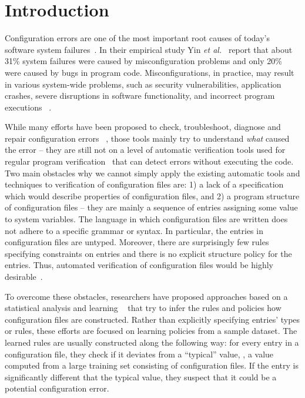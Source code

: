 \section{Introduction}
\label{sec-intro}

Configuration errors are one of the most important root causes of
today's software system failures~\cite{xu15systems, yin11anempirical}.
In their empirical study Yin {\em et al.}~\cite{yin11anempirical} report
that about 31\% system failures were caused by misconfiguration problems and only 20\% were caused by bugs in program code. 
Misconfigurations, in practice, may result in various
system-wide problems, such as security vulnerabilities, 
application crashes, severe disruptions in software
functionality, and incorrect program executions%
~\cite{zhang14encore, yuan11context, xu13do, xu15hey}.  

While many efforts have been proposed 
to check, troubleshoot, diagnose and repair configuration errors%
~\cite{attariyan10automating,
su07autobash, whitaker04configuration},
those tools mainly try to understand {\emph{what}} caused the 
error -- they are still not on a level of
automatic verification tools used for regular program 
verification~\cite{Leino10Dafny, PiskacWZ14, BobotFMP15} that can
detect errors without executing the code.
Two main obstacles why we cannot simply apply the existing automatic 
tools and techniques to verification of configuration files are: 1) a lack
of a specification which would describe properties of configuration files, and 2) a program structure of configuration files -- they
are mainly a sequence of entries assigning some value to system variables. The language in which configuration files are written does 
not adhere to a specific grammar or syntax. In particular, the
entries in configuration files are untyped. Moreover, there are surprisingly few rules specifying constraints on entries and there
is no explicit structure policy for the entries.
Thus, automated verification of configuration 
files would be highly
desirable~\cite{wang04automatic, zhang14encore, xu15systems}.

To overcome these obstacles, researchers have proposed approaches based on
a statistical analysis and learning%
~\cite{wang04automatic, zhang14encore, yuan11context}
that try to infer the rules and policies 
how configuration files are constructed.
Rather than explicitly specifying entries' types or rules, 
these efforts are focused on learning policies from a sample dataset.
The learned rules are usually constructed along the following way: 
for every entry in a configuration file, 
they check if it deviates from a ``typical'' value, \ie, 
a value computed from a large training set 
consisting of configuration files.
If the entry is significantly different that the typical value, 
they suspect that it could be a potential configuration error.

